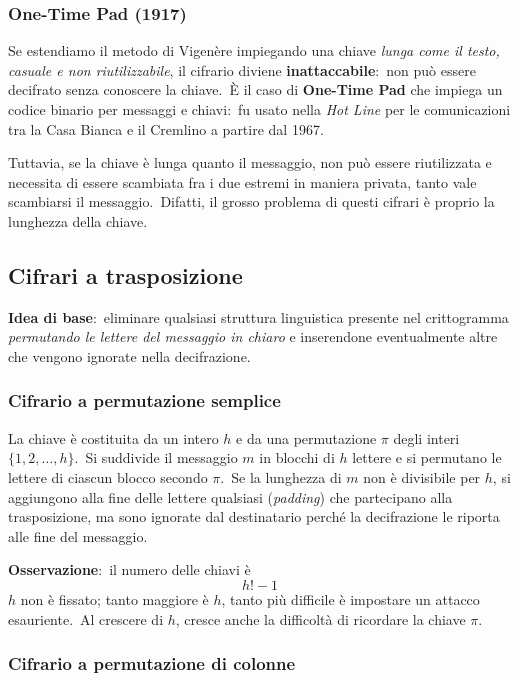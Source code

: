 \subsubsection{One-Time Pad (1917)}

Se estendiamo il metodo di Vigenère impiegando una chiave \textit{lunga come il testo, casuale e non riutilizzabile}, il cifrario diviene \textbf{inattaccabile}:\ non può essere decifrato senza conoscere la chiave.\
È il caso di \textbf{One-Time Pad} che impiega un codice binario per messaggi e chiavi:\ fu usato nella \textit{Hot Line} per le comunicazioni tra la Casa Bianca e il Cremlino a partire dal 1967.\

Tuttavia, se la chiave è lunga quanto il messaggio, non può essere riutilizzata e necessita di essere scambiata fra i due estremi in maniera privata, tanto vale scambiarsi il messaggio.\
Difatti, il grosso problema di questi cifrari è proprio la lunghezza della chiave.

\subsection{Cifrari a trasposizione}

\textbf{Idea di base}:\ eliminare qualsiasi struttura linguistica presente nel crittogramma \textit{permutando le lettere del messaggio in chiaro} e inserendone eventualmente altre che vengono ignorate nella decifrazione.\

\subsubsection{Cifrario a permutazione semplice}

La chiave è costituita da un intero $h$ e da una permutazione $\pi$ degli interi $\{1,2,\dots,h\}$.\
Si suddivide il messaggio $m$ in blocchi di $h$ lettere e si permutano le lettere di ciascun blocco secondo $\pi$.\
Se la lunghezza di $m$ non è divisibile per $h$, si aggiungono alla fine delle lettere qualsiasi (\textit{padding}) che partecipano alla trasposizione, ma sono ignorate dal destinatario perché la decifrazione le riporta alle fine del messaggio.\

\textbf{Osservazione}:\ il numero delle chiavi è
\[h!-1\]
$h$ non è fissato; tanto maggiore è $h$, tanto più difficile è impostare un attacco esauriente.\
Al crescere di $h$, cresce anche la difficoltà di ricordare la chiave $\pi$.\

\subsubsection{Cifrario a permutazione di colonne}

